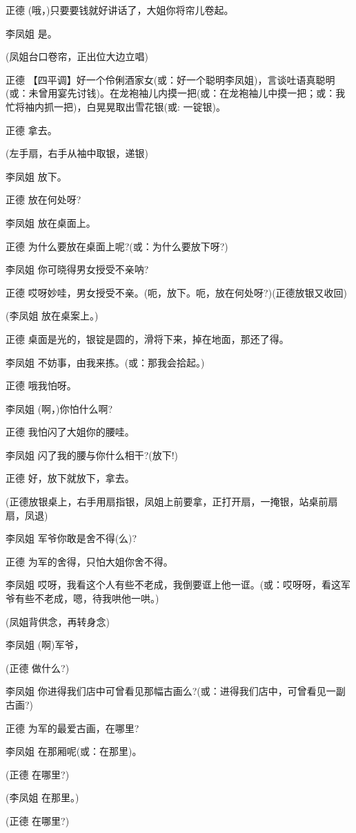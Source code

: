 正德 (哦，)只要要钱就好讲话了，大姐你将帘儿卷起。

李凤姐 是。

(凤姐台口卷帘，正出位大边立唱)

正德
【四平调】好一个伶俐酒家女(或：好一个聪明李凤姐)，言谈吐语真聪明(或：未曾用宴先讨钱)。在龙袍袖儿内摸一把(或：在龙袍袖儿中摸一把；或：我忙将袖内抓一把)，白晃晃取出雪花银(或:
一锭银)。

正德 拿去。

(左手扇，右手从袖中取银，递银)

李凤姐 放下。

正德 放在何处呀?

李凤姐 放在桌面上。

正德 为什么要放在桌面上呢?(或：为什么要放下呀?)

李凤姐 你可晓得男女授受不亲呐?

正德 哎呀妙哇，男女授受不亲。(呃，放下。呃，放在何处呀?)(正德放银又收回)

(李凤姐 放在桌案上。)

正德 桌面是光的，银锭是圆的，滑将下来，掉在地面，那还了得。

李凤姐 不妨事，由我来拣。(或：那我会拾起。)

正德 哦我怕呀。

李凤姐 (啊，)你怕什么啊?

正德 我怕闪了大姐你的腰哇。

李凤姐 闪了我的腰与你什么相干?(放下!)

正德 好，放下就放下，拿去。

(正德放银桌上，右手用扇指银，凤姐上前要拿，正打开扇，一掩银，站桌前扇扇，凤退)

李凤姐 军爷你敢是舍不得(么)?

正德 为军的舍得，只怕大姐你舍不得。

李凤姐
哎呀，我看这个人有些不老成，我倒要诓上他一诓。(或：哎呀呀，看这军爷有些不老成，嗯，待我哄他一哄。)

(凤姐背供念，再转身念)

李凤姐 (啊)军爷，

(正德 做什么?)

李凤姐
你进得我们店中可曾看见那幅古画么?(或：进得我们店中，可曾看见一副古画?)

正德 为军的最爱古画，在哪里?

李凤姐 在那厢呢(或：在那里)。

(正德 在哪里?)

(李凤姐 在那里。)

(正德 在哪里?)

